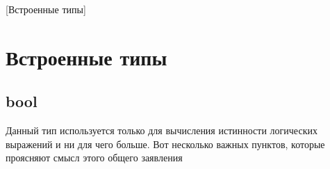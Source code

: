 [Встроенные типы]


\section{Встроенные типы}


\subsection{bool}

Данный тип используется только для вычисления истинности логических выражений и ни для чего больше.
Вот несколько важных пунктов, которые проясняют смысл этого общего заявления
